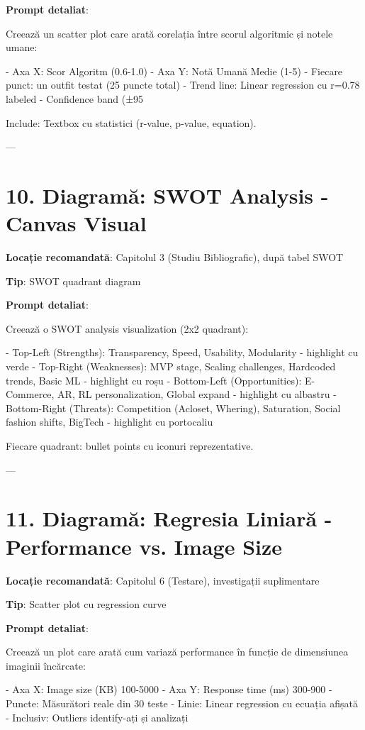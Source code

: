 \textbf{Prompt detaliat}:

Creează un scatter plot care arată corelația între scorul algoritmic și notele umane:

- Axa X: Scor Algoritm (0.6-1.0)
- Axa Y: Notă Umană Medie (1-5)
- Fiecare punct: un outfit testat (25 puncte total)
- Trend line: Linear regression cu r=0.78 labeled
- Confidence band (±95%

Include: Textbox cu statistici (r-value, p-value, equation).

---

\section{10. Diagramă: SWOT Analysis - Canvas Visual}

\textbf{Locație recomandată}: Capitolul 3 (Studiu Bibliografic), după tabel SWOT

\textbf{Tip}: SWOT quadrant diagram

\textbf{Prompt detaliat}:

Creează o SWOT analysis visualization (2x2 quadrant):

- Top-Left (Strengths): Transparency, Speed, Usability, Modularity - highlight cu verde
- Top-Right (Weaknesses): MVP stage, Scaling challenges, Hardcoded trends, Basic ML - highlight cu roșu
- Bottom-Left (Opportunities): E-Commerce, AR, RL personalization, Global expand - highlight cu albastru
- Bottom-Right (Threats): Competition (Acloset, Whering), Saturation, Social fashion shifts, BigTech - highlight cu portocaliu

Fiecare quadrant: bullet points cu iconuri reprezentative.

---

\section{11. Diagramă: Regresia Liniară - Performance vs. Image Size}

\textbf{Locație recomandată}: Capitolul 6 (Testare), investigații suplimentare

\textbf{Tip}: Scatter plot cu regression curve

\textbf{Prompt detaliat}:

Creează un plot care arată cum variază performance în funcție de dimensiunea imaginii încărcate:

- Axa X: Image size (KB) 100-5000
- Axa Y: Response time (ms) 300-900
- Puncte: Măsurători reale din 30 teste
- Linie: Linear regression cu ecuația afișată
- Inclusiv: Outliers identify-ați și analizați

